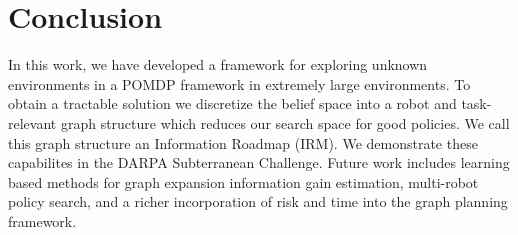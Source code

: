 \documentclass[letterpaper, 10 pt, conference]{ieeeconf}  %
\begin{document}
\section{Conclusion}

In this work, we have developed a framework for exploring unknown environments in a POMDP framework in extremely large environments.  
To obtain a tractable solution we discretize the belief space into a robot and task-relevant graph structure which reduces our search space for good policies.  We call this graph structure an Information Roadmap (IRM).  We demonstrate these capabilites in the DARPA Subterranean Challenge.  Future work includes learning based methods for graph expansion information gain estimation, multi-robot policy search, and a richer incorporation of risk and time into the graph planning framework.




\end{document}

